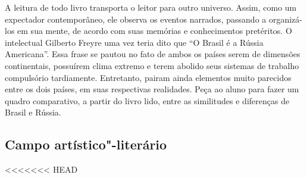 \documentclass[12pt]{extarticle}
\begin{document}
A leitura de todo livro transporta o leitor para outro universo.
Assim, como um expectador contemporâneo, ele observa os eventos
narrados, passando a organizá-los em sua mente, de acordo com suas
memórias e conhecimentos pretéritos. O intelectual Gilberto Freyre uma
vez teria dito que ``O Brasil é a Rússia Americana''. Essa frase se
pautou no fato de ambos os países serem de dimensões continentais,
possuírem clima extremo e terem abolido seus sistemas de trabalho
compulsório tardiamente. Entretanto, pairam ainda elementos muito
parecidos entre os dois países, em suas respectivas realidades. Peça
ao aluno para fazer um quadro comparativo, a partir do livro lido,
entre as similitudes e diferenças de Brasil e Rússia.

\subsection{Campo artístico"-literário}

<<<<<<< HEAD

\end{document}
